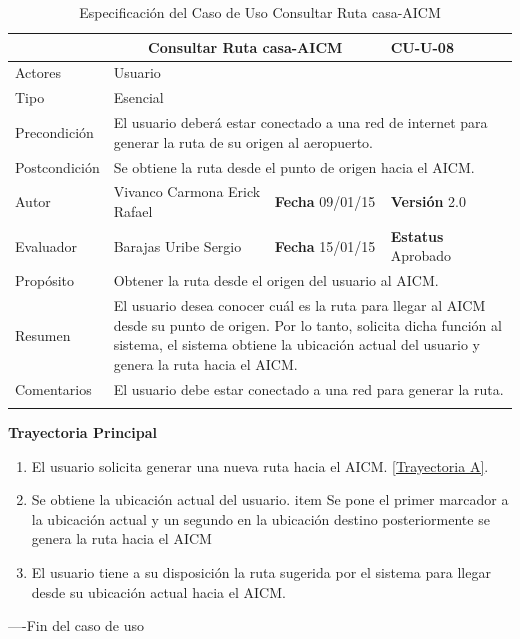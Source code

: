 \begin{longtable}{|p{2.5cm}|p{6.4cm}|p{2cm}|p{2cm}|}
	\hline
		\rowcolor[RGB]{51,153,255}{Caso de Uso}&\multicolumn{2}{c}{Consultar Ruta casa-AICM}&{\textbf{CU-U-08}}\\
	\hline
		{Actores}&\multicolumn{3}{p{11.2cm}|}{Usuario}\\
	\hline
		{Tipo}&\multicolumn{3}{p{11.2cm}|}{Esencial}\\
	\hline
		{Precondición}&\multicolumn{3}{p{11.2cm}|}{El usuario deberá estar conectado a una red de internet para generar la ruta de su origen al aeropuerto.}\\
	\hline
		{Postcondición}&\multicolumn{3}{p{11.2cm}|}{Se obtiene la ruta desde el punto de origen hacia el AICM.}\\
	\hline
		{Autor}&{Vivanco Carmona Erick Rafael}&{\textbf{Fecha} 09/01/15}&{\textbf{Versión} 2.0}\\
			\hline
		{Evaluador}&{Barajas Uribe Sergio}&{\textbf{Fecha} 15/01/15}&{\textbf{Estatus} Aprobado}\\
	\hline
		{Propósito}&\multicolumn{3}{p{11.2cm}|}{Obtener la ruta desde el origen del usuario al AICM.}\\
	\hline
		{Resumen}&\multicolumn{3}{p{11.2cm}|}{El usuario desea conocer cuál es la ruta para llegar al AICM desde su punto de origen. Por lo tanto, solicita dicha función al sistema, el sistema obtiene la ubicación actual del usuario y  genera la ruta hacia el AICM.}\\	
	\hline
		{Comentarios}&\multicolumn{3}{p{11.2cm}|}{El usuario debe estar conectado a una red para generar la ruta.}\\
	\hline
	\caption[Especificación del Caso de Uso Consultar Ruta casa-AICM]{Especificación del Caso de Uso Consultar Ruta casa-AICM}
    	\label{tab:cuConsultarRutacasa-AICM}
\end{longtable}
\clearpage

\begin{flushleft}
	\textbf{Trayectoria Principal}\\
	\begin{enumerate}
		\item El usuario solicita generar una nueva ruta hacia el AICM. \hyperlink{TrayectoriaA_CU-U-08}{[Trayectoria A]}.
		\item Se obtiene la ubicación actual del usuario.
		 item Se pone el primer marcador a la ubicación actual y un segundo en la ubicación destino posteriormente se genera la ruta hacia el AICM
		\item El usuario tiene a su disposición la ruta sugerida por el sistema para llegar desde su ubicación actual hacia el AICM.
	\end{enumerate}
\end{flushleft}
----Fin del caso de uso

